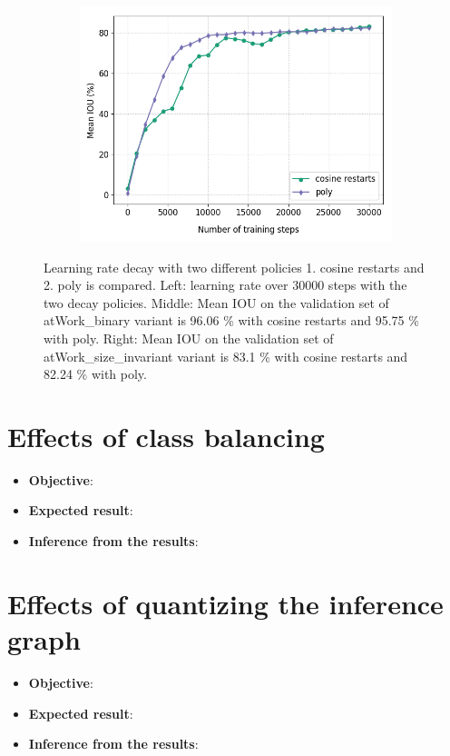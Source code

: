 \begin{figure}
\begin{subfigure}{.3\textwidth}
			\includegraphics[width=1\linewidth]{images/lr_size}
		\end{subfigure}
		\caption{Learning rate decay with two different policies 1. cosine restarts and 2. poly is compared. Left: learning rate over 30000 steps with the two decay policies. Middle: Mean IOU on the validation set of atWork\_binary variant is 96.06 \% with cosine restarts and 95.75 \% with poly. Right: Mean IOU on the validation set of atWork\_size\_invariant variant is 83.1 \% with cosine restarts and 82.24 \% with poly.}
		\label{Fig:lr}
	\end{figure}

\section{Effects of class balancing}

	\begin{itemize}
		\item \textbf{Objective}:
		\item \textbf{Expected result}:
		\item \textbf{Inference from the results}:
	\end{itemize}

\section{Effects of quantizing the inference graph}
	
	\begin{itemize}
		\item \textbf{Objective}:
		\item \textbf{Expected result}:
		\item \textbf{Inference from the results}:
	\end{itemize}

